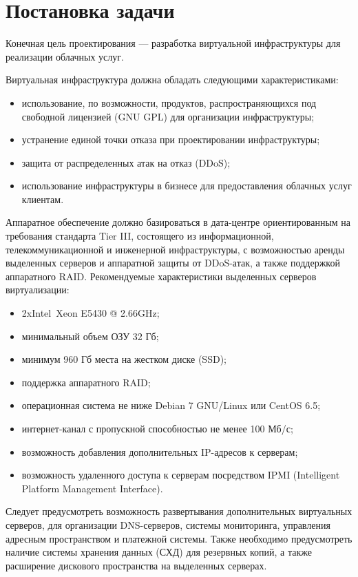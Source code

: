 \section{Постановка задачи}

Конечная цель проектирования --- разработка виртуальной инфраструктуры для реализации облачных услуг.

Виртуальная инфраструктура должна обладать следующими характеристиками:
\begin{itemize}
    \item использование, по возможности, продуктов, распространяющихся под свободной лицензией (GNU GPL) для организации инфраструктуры;
    \item устранение единой точки отказа при проектировании инфраструктуры;
    \item защита от распределенных атак на отказ (DDoS);
    \item использование инфраструктуры в бизнесе для предоставления облачных услуг клиентам.
\end{itemize}

Аппаратное обеспечение должно базироваться в дата-центре ориентированным на требования стандарта Tier III, состоящего из информационной, телекоммуникационной и инженерной инфраструктуры, с возможностью аренды выделенных серверов и аппаратной защиты от DDoS-атак, а также поддержкой аппаратного RAID.
Рекомендуемые характеристики выделенных серверов виртуализации:
\begin{itemize}
    \item 2xIntel\textregistered~Xeon E5430 @ 2.66GHz;
    \item минимальный объем ОЗУ 32 Гб;
    \item минимум 960 Гб места на жестком диске (SSD);
    \item поддержка аппаратного RAID;
    \item операционная система не ниже Debian 7 GNU/Linux или CentOS 6.5;
    \item интернет-канал с пропускной способностью не менее 100 Мб/с;
    \item возможность добавления дополнительных IP-адресов к серверам;
    \item возможность удаленного доступа к серверам посредством IPMI (Intelligent Platform Management Interface).
\end{itemize}

Следует предусмотреть возможность развертывания дополнительных виртуальных серверов, для организации DNS-серверов, системы мониторинга, управления адресным пространством и платежной системы.
Также необходимо предусмотреть наличие системы хранения данных (СХД) для резервных копий, а также расширение дискового пространства на выделенных серверах.

